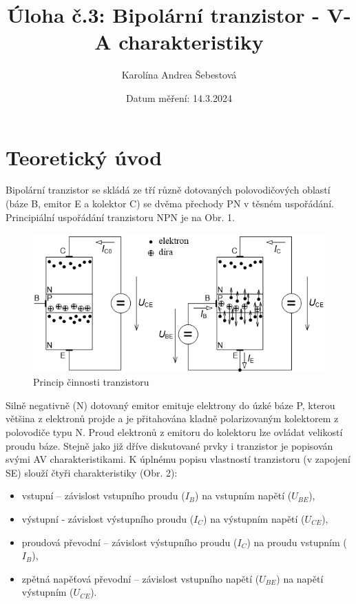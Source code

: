 \documentclass[a4paper, czech]{article}
\title{Úloha č.3: Bipolární tranzistor - V-A charakteristiky}
\author{Karolína Andrea Šebestová}
\date{Datum měření: 14.3.2024}
\begin{document}
\maketitle
\section{Teoretický úvod}

Bipolární tranzistor se skládá ze tří různě dotovaných polovodičových oblastí (báze B, emitor E a kolektor C) se dvěma přechody PN v těsném uspořádání. Principiální uspořádání tranzistoru NPN je na Obr. 1.

\begin{figure}[H]
    \centering
    \includegraphics{princip_tranzistoru.png}
    \caption{Princip činnosti tranzistoru}
    \label{obr:1}
\end{figure}

Silně negativně (N) dotovaný emitor emituje elektrony do úzké báze P, kterou většina z elektronů projde a je přitahována kladně polarizovaným kolektorem z polovodiče typu N. Proud elektronů z emitoru do kolektoru lze ovládat velikostí proudu báze. Stejně jako již dříve diskutované prvky i tranzistor je popisován svými AV charakteristikami. K úplnému popisu vlastností tranzistoru (v zapojení SE) slouží čtyři charakteristiky (Obr. 2):

\begin{itemize}
    \item vstupní – závislost vstupního proudu ($I_B$) na vstupním napětí ($U_{BE}$),
    \item výstupní - závislost výstupního proudu ($I_C$) na výstupním napětí ($U_{CE}$),
    \item proudová převodní – závislost výstupního proudu ($I_C$) na proudu vstupním ($I_B$),
    \item zpětná napěťová převodní – závislost vstupního napětí ($U_{BE}$) na napětí výstupním ($U_{CE}$).
\end{itemize}
\end{document}
